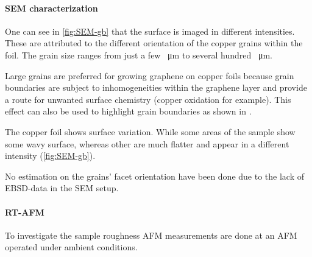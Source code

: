 	\paragraph{SEM characterization} One can see in \autoref{fig:SEM-gb} that the surface is imaged in different intensities. These are attributed to the different orientation of the copper grains within the foil\cite{wu_effects_2015}. The grain size ranges from just a few \SI{}{\micro \meter} to several hundred \SI{}{\micro \meter}. 
	
	Large grains are preferred for growing graphene on copper foils because grain boundaries are subject to inhomogeneities within the graphene layer and provide a route for unwanted surface chemistry (copper oxidation for example). This effect can also be used to highlight grain boundaries as shown in \cite{wu_effects_2015}.
	
	The copper foil shows surface variation. While some areas of the sample show some wavy surface, whereas other are much flatter and appear in a different intensity (\autoref{fig:SEM-gb}).
	
	No estimation on the grains' facet orientation have been done due to the lack of EBSD-data in the SEM setup.
	
	
	\paragraph{RT-AFM}
	\label{sec:foil-AFM}
	To investigate the sample roughness AFM measurements are done at an AFM operated under ambient conditions.
	
